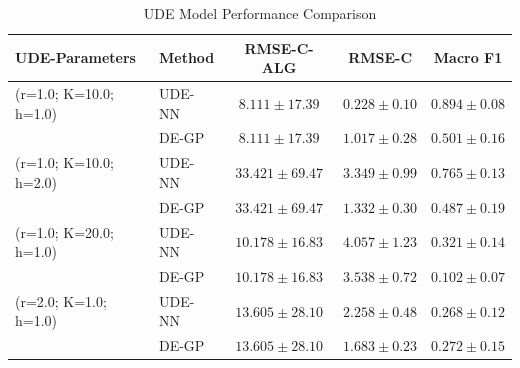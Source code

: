 \documentclass[openacc]{rsproca_new}%
\begin{document}
\begin{table}[H]
\centering
\caption{UDE Model Performance Comparison}
\label{tab:params_c}
\begin{tabular}{llccc}
\hline
\textbf{UDE-Parameters} & \textbf{Method} & \textbf{RMSE-C-ALG} & \textbf{RMSE-C} & \textbf{Macro F1} \\ \hline
(r=1.0; K=10.0; h=1.0) & UDE-NN & $8.111 \pm 17.39$ & $0.228 \pm 0.10$ & $0.894 \pm 0.08$ \\
                      &DE-GP     & $8.111 \pm 17.39$ & $1.017 \pm 0.28$ & $0.501 \pm 0.16$ \\ \hline
(r=1.0; K=10.0; h=2.0) & UDE-NN & $33.421 \pm 69.47$ & $3.349 \pm 0.99$ & $0.765 \pm 0.13$ \\
                      &DE-GP     & $33.421 \pm 69.47$ & $1.332 \pm 0.30$ & $0.487 \pm 0.19$ \\ \hline
(r=1.0; K=20.0; h=1.0) & UDE-NN & $10.178 \pm 16.83$ & $4.057 \pm 1.23$ & $0.321 \pm 0.14$ \\
                      &DE-GP     & $10.178 \pm 16.83$ & $3.538 \pm 0.72$ & $0.102 \pm 0.07$ \\ \hline
(r=2.0; K=1.0; h=1.0) & UDE-NN & $13.605 \pm 28.10$ & $2.258 \pm 0.48$ & $0.268 \pm 0.12$ \\
                      &DE-GP     & $13.605 \pm 28.10$ & $1.683 \pm 0.23$ & $0.272 \pm 0.15$ \\ \hline
\end{tabular}
\end{table}
% 
% 
\end{document}
